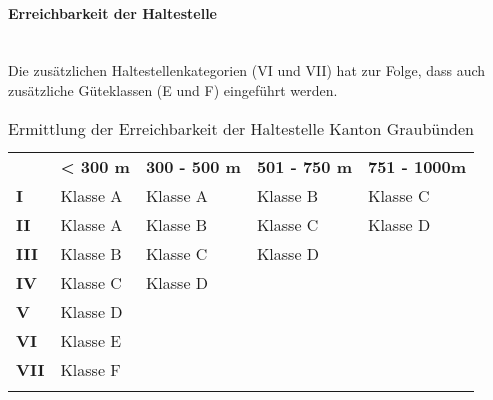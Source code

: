\paragraph{Erreichbarkeit der Haltestelle}~\\
\label{Berechnungsmethodik Kanton Graubünden:Erreichbarkeit der Haltestelle}
Die zusätzlichen Haltestellenkategorien (VI und VII) hat zur Folge, dass auch zusätzliche Güteklassen (E und F) eingeführt werden.

\begin{longtable}[c]{l p{3.3cm} p{3.3cm} p{3.3cm} p{3.3cm}}
        \midrule
        \textbf{}
                                & \textbf{< 300 m}
                                & \textbf{300 - 500 m}
                                & \textbf{501 - 750 m}
                                & \textbf{751 - 1000m}\\
        \textbf{I}
                                & Klasse A
                                & Klasse A
                                & Klasse B
                                & Klasse C\\
        \textbf{II}
                                & Klasse A
                                & Klasse B
                                & Klasse C
                                & Klasse D\\
        \textbf{III}
                                & Klasse B
                                & Klasse C
                                & Klasse D
                                &\\
        \textbf{IV}
                                & Klasse C
                                & Klasse D
                                &
                                &\\
        \textbf{V}
                                & Klasse D
                                &
                                &
                                &\\
        \cellcolor{red!25}\textbf{VI}
                                & \cellcolor{red!25}Klasse E
                                &
                                &
                                &\\
        \cellcolor{red!25}\textbf{VII}
                                & \cellcolor{red!25}Klasse F
                                &
                                &
                                &\\                                
        \bottomrule
    \caption{Ermittlung der Erreichbarkeit der Haltestelle Kanton Graubünden}
    \label{table:Ermittlung Erreichbarkeit der Haltestelle Kanton Graubünden}
\end{longtable}


